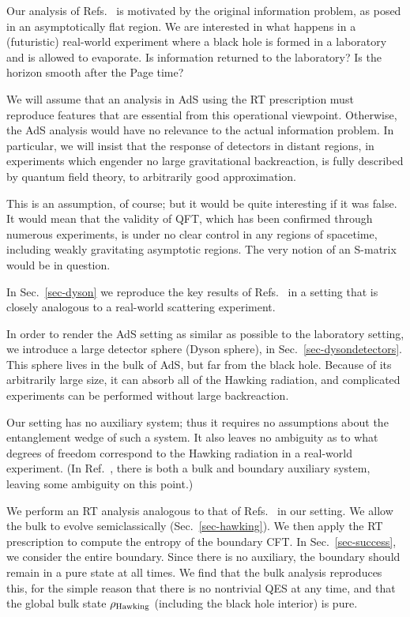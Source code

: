 \documentclass[12pt,letterpaper]{article}
\begin{document}
Our analysis of Refs.~\cite{Pen19,AEMM} is motivated by the original information problem, as posed in an asymptotically flat region. We are interested in what happens in a (futuristic) real-world experiment where a black hole is formed in a laboratory and is allowed to evaporate. Is information returned to the laboratory? Is the horizon smooth after the Page time?

We will assume that an analysis in AdS using the RT prescription must reproduce features that are essential from this operational viewpoint. Otherwise, the AdS analysis would have no relevance to the actual information problem. In particular, we will insist that the response of detectors in distant regions, in experiments which engender no large gravitational backreaction, is fully described by quantum field theory, to arbitrarily good approximation.

This is an assumption, of course; but it would be quite interesting if it was false. It would mean that the validity of QFT, which has been confirmed through numerous experiments, is under no clear control in any regions of spacetime, including weakly gravitating asymptotic regions. The very notion of an S-matrix would be in question.

In Sec.~\ref{sec-dyson} we reproduce the key results of Refs.~\cite{Pen19,AEMM} in a setting that is closely analogous to a real-world scattering experiment.

In order to render the AdS setting as similar as possible to the laboratory setting, we introduce a large detector sphere (Dyson sphere), in Sec.~\ref{sec-dysondetectors}. This sphere lives in the bulk of AdS, but far from the black hole. Because of its arbitrarily large size, it can absorb all of the Hawking radiation, and complicated experiments can be performed without large backreaction.

Our setting has no auxiliary system; thus it requires no assumptions about the entanglement wedge of such a system. It also leaves no ambiguity as to what degrees of freedom correspond to the Hawking radiation in a real-world experiment. (In Ref.~\cite{Pen19}, there is both a bulk and boundary auxiliary system, leaving some ambiguity on this point.)

We perform an RT analysis analogous to that of Refs.~\cite{Pen19,AEMM} in our setting. We allow the bulk to evolve semiclassically (Sec.~\ref{sec-hawking}). We then apply the RT prescription to compute the entropy of the boundary CFT. In Sec.~\ref{sec-success}, we consider the entire boundary. Since there is no auxiliary, the boundary should remain in a pure state at all times. We find that the bulk analysis reproduces this, for the simple reason that there is no nontrivial QES at any time, and that the global bulk state $\rho_{\rm Hawking}$ (including the black hole interior) is pure.
\end{document}

